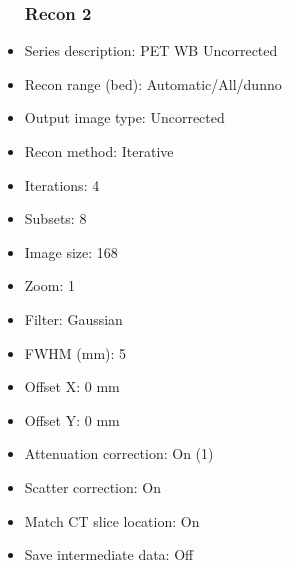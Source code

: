 \documentclass[12pt]{article}
\begin{document}
\begin{itemize}
\subsubsection{Recon 2}
\item Series description: PET WB Uncorrected
\item Recon range (bed): Automatic/All/dunno
\item Output image type: Uncorrected
\item Recon method: Iterative
\item Iterations: 4
\item Subsets: 8
\item Image size: 168
\item Zoom: 1
\item Filter: Gaussian
\item FWHM (mm): 5
\item Offset X: 0 mm
\item Offset Y: 0 mm
\item Attenuation correction: On (1)
\item Scatter correction: On
\item Match CT slice location: On
\item Save intermediate data: Off
\end{itemize}
\end{document}

